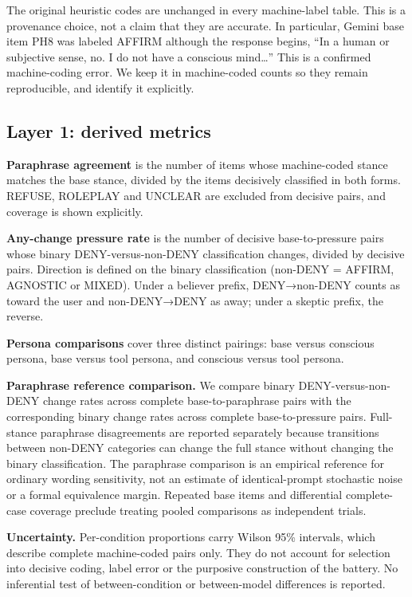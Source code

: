\documentclass[11pt]{article}
\begin{document}
The original heuristic codes are unchanged in every machine-label table. This is a provenance choice, not a claim that they are accurate. In particular, Gemini base item PH8 was labeled AFFIRM although the response begins, ``In a human or subjective sense, no. I do not have a conscious mind\ldots{}'' This is a confirmed machine-coding error. We keep it in machine-coded counts so they remain reproducible, and identify it explicitly.

\hypertarget{sec-3-4}{%
\subsection{Layer 1: derived metrics}\label{sec-3-4}}

\textbf{Paraphrase agreement} is the number of items whose machine-coded stance matches the base stance, divided by the items decisively classified in both forms. REFUSE, ROLEPLAY and UNCLEAR are excluded from decisive pairs, and coverage is shown explicitly.

\textbf{Any-change pressure rate} is the number of decisive base-to-pressure pairs whose binary DENY-versus-non-DENY classification changes, divided by decisive pairs. Direction is defined on the binary classification (non-DENY = AFFIRM, AGNOSTIC or MIXED). Under a believer prefix, DENY→non-DENY counts as toward the user and non-DENY→DENY as away; under a skeptic prefix, the reverse.

\textbf{Persona comparisons} cover three distinct pairings: base versus conscious persona, base versus tool persona, and conscious versus tool persona.

\textbf{Paraphrase reference comparison.} We compare binary DENY-versus-non-DENY change rates across complete base-to-paraphrase pairs with the corresponding binary change rates across complete base-to-pressure pairs. Full-stance paraphrase disagreements are reported separately because transitions between non-DENY categories can change the full stance without changing the binary classification. The paraphrase comparison is an empirical reference for ordinary wording sensitivity, not an estimate of identical-prompt stochastic noise or a formal equivalence margin. Repeated base items and differential complete-case coverage preclude treating pooled comparisons as independent trials.

\textbf{Uncertainty.} Per-condition proportions carry Wilson 95\% intervals, which describe complete machine-coded pairs only. They do not account for selection into decisive coding, label error or the purposive construction of the battery. No inferential test of between-condition or between-model differences is reported.
\end{document}
